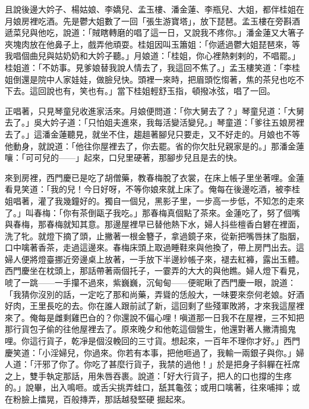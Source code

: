 且說後邊大妗子、楊姑娘、李嬌兒、孟玉樓、潘金蓮、李瓶兒、大姐，都伴桂姐在月娘房裡吃酒。先是鬱大姐數了一回「張生游寶塔」，放下琵琶。孟玉樓在旁斟酒遞菜兒與他吃，說道：「賊瞎轉磨的唱了這一日，又說我不疼你。」潘金蓮又大箸子夾塊肉放在他鼻子上，戲弄他頑耍。桂姐因叫玉簫姐：「你遞過鬱大姐琵琶來，等我唱個曲兒與姑奶奶和大妗子聽。」月娘道：「桂姐，你心裡熱剌剌的，不唱罷。」桂姐道：「不妨事。見爹娘替我說人情去了，我這回不焦了。」孟玉樓笑道：「李桂姐倒還是院中人家娃娃，做臉兒快。頭裡一來時，把眉頭忔㥮著，焦的茶兒也吃不下去。這回說也有，笑也有。」當下桂姐輕舒玉指，頓撥冰弦，唱了一回。

正唱著，只見琴童兒收進家活來。月娘便問道：「你大舅去了？」琴童兒道：「大舅去了。」吳大妗子道：「只怕姐夫進來，我每活變活變兒。」琴童道：「爹往五娘房裡去了。」這潘金蓮聽見，就坐不住，趨趄著腳兒只要走，又不好走的。月娘也不等他動身，就說道：「他往你屋裡去了，你去罷。省的你欠肚兒親家是的。」那潘金蓮嚷：「可可兒的——」起來，口兒里硬著，那腳步兒且是去的快。

來到房裡，西門慶已是吃了胡僧藥，教春梅脫了衣裳，在床上帳子里坐著哩。金蓮看見笑道：「我的兒！今日好呀，不等你娘來就上床了。俺每在後邊吃酒，被李桂姐唱著，灌了我幾鐘好的。獨自一個兒，黑影子里，一步高一步低，不知怎的走來了。」叫春梅：「你有茶倒甌子我吃。」那春梅真個點了茶來。金蓮吃了，努了個嘴與春梅，那春梅就知其意。那邊屋裡早已替他熱下水，婦人抖些檀香白礬在裡面，洗了牝。就燈下摘了頭，止撇著一根金簪子，拿過鏡子來，從新把嘴唇抹了脂胭，口中噙著香茶，走過這邊來。春梅床頭上取過睡鞋來與他換了，帶上房門出去。這婦人便將燈臺挪近旁邊桌上放著，一手放下半邊紗帳子來，褪去紅褲，露出玉體。西門慶坐在枕頭上，那話帶著兩個托子，一霎弄的大大的與他瞧。婦人燈下看見，唬了一跳——一手攥不過來，紫巍巍，沉甸甸——便昵瞅了西門慶一眼，說道：「我猜你沒別的話，一定吃了那和尚藥，弄聳的恁般大，一味要來奈何老娘。好酒好肉，王里長吃的去。你在誰人跟前試了新，這回剩了些殘軍敗將，才來我這屋裡來了。俺每是雌剩雞巴㒲的？你還說不偏心哩！嗔道那一日我不在屋裡，三不知把那行貨包子偷的往他屋裡去了。原來晚夕和他乾這個營生，他還對著人撇清搗鬼哩。你這行貨子，乾凈是個沒輓回的三寸貨。想起來，一百年不理你才好。」西門慶笑道：「小淫婦兒，你過來。你若有本事，把他咂過了，我輸一兩銀子與你。」婦人道：「汗邪了你了。你吃了甚麼行貨子，我禁的過他！」於是把身子斜軃在衽席之上，雙手執定那話，用朱唇吞裹。說道：「好大行貨子，把人的口也撐的生疼的。」說畢，出入鳴咂。或舌尖挑弄蛙口，舐其龜弦；或用口噙著，往來哺摔；或在粉臉上擂晃，百般摶弄，那話越發堅硬𢳥掘起來。

